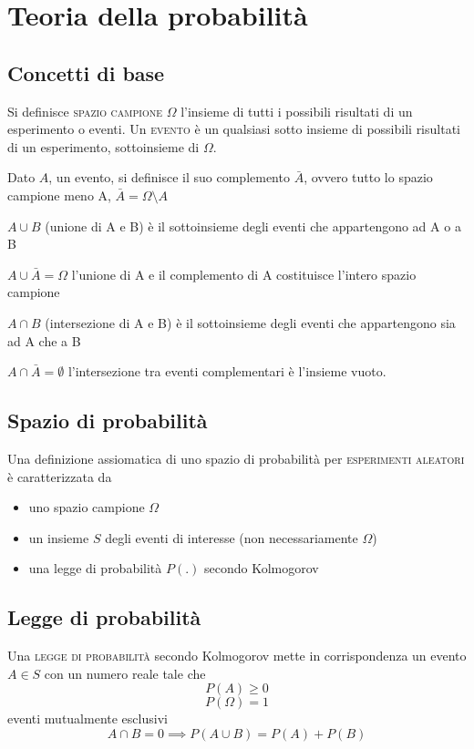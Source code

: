 \chapter{Teoria della probabilità}

\section{Concetti di base}
Si definisce \textsc{spazio campione $\Omega$} l'insieme di tutti i possibili risultati di un esperimento o eventi. Un \textsc{evento} è un qualsiasi sotto insieme di possibili risultati di un esperimento, sottoinsieme di $\Omega$.

Dato $A$, un evento, si definisce il suo complemento $\bar{A}$, ovvero tutto lo spazio campione meno A, $\bar{A}=\Omega\setminus A$

$A\cup B$ (unione di A e B) è il sottoinsieme degli eventi che appartengono ad A o a B

$A\cup\bar{A}=\Omega$ l'unione di A e il complemento di A costituisce l'intero spazio campione

$A\cap B$ (intersezione di A e B) è il sottoinsieme degli eventi che appartengono sia ad A che a B

$A\cap\bar{A}=\emptyset$ l'intersezione tra eventi complementari è l'insieme vuoto.

\section{Spazio di probabilità}
Una definizione assiomatica di uno spazio di probabilità per \textsc{esperimenti aleatori} è caratterizzata da 
\begin{itemize}
\item uno spazio campione $\Omega$
\item un insieme $S$ degli eventi di interesse (non necessariamente $\Omega$)
\item una legge di probabilità $P(.)$ secondo Kolmogorov
\end{itemize}

\section{Legge di probabilità}
Una \textsc{legge di probabilità} secondo Kolmogorov mette in corrispondenza un evento $A\in S$ con un numero reale tale che
\begin{equation}P(A)\geq 0\end{equation}
\begin{equation}P(\Omega)=1\end{equation}
eventi mutualmente esclusivi \begin{equation}A\cap B=0\implies P(A\cup B)=P(A)+P(B)\end{equation}

